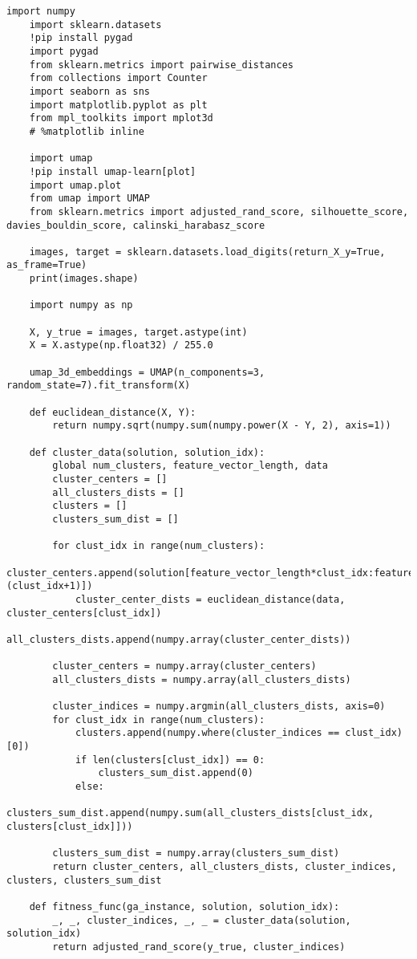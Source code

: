 \begin{lstlisting}[label=lst:1,caption=Кластеризация с использованием генетического алгоритма]
	import numpy
	import sklearn.datasets
	!pip install pygad
	import pygad
	from sklearn.metrics import pairwise_distances
	from collections import Counter
	import seaborn as sns
	import matplotlib.pyplot as plt
	from mpl_toolkits import mplot3d
	# %matplotlib inline
	
	import umap
	!pip install umap-learn[plot]
	import umap.plot
	from umap import UMAP
	from sklearn.metrics import adjusted_rand_score, silhouette_score, davies_bouldin_score, calinski_harabasz_score
	
	images, target = sklearn.datasets.load_digits(return_X_y=True, as_frame=True)
	print(images.shape)
	
	import numpy as np
	
	X, y_true = images, target.astype(int)
	X = X.astype(np.float32) / 255.0
	
	umap_3d_embeddings = UMAP(n_components=3, random_state=7).fit_transform(X)
	
	def euclidean_distance(X, Y):
		return numpy.sqrt(numpy.sum(numpy.power(X - Y, 2), axis=1))
	
	def cluster_data(solution, solution_idx):
		global num_clusters, feature_vector_length, data
		cluster_centers = []
		all_clusters_dists = []
		clusters = []
		clusters_sum_dist = []
		
		for clust_idx in range(num_clusters):
			cluster_centers.append(solution[feature_vector_length*clust_idx:feature_vector_length*(clust_idx+1)])
			cluster_center_dists = euclidean_distance(data, cluster_centers[clust_idx])
			all_clusters_dists.append(numpy.array(cluster_center_dists))
		
		cluster_centers = numpy.array(cluster_centers)
		all_clusters_dists = numpy.array(all_clusters_dists)
		
		cluster_indices = numpy.argmin(all_clusters_dists, axis=0)
		for clust_idx in range(num_clusters):
			clusters.append(numpy.where(cluster_indices == clust_idx)[0])
			if len(clusters[clust_idx]) == 0:
				clusters_sum_dist.append(0)
			else:
				clusters_sum_dist.append(numpy.sum(all_clusters_dists[clust_idx, clusters[clust_idx]]))
		
		clusters_sum_dist = numpy.array(clusters_sum_dist)
		return cluster_centers, all_clusters_dists, cluster_indices, clusters, clusters_sum_dist
	
	def fitness_func(ga_instance, solution, solution_idx):
		_, _, cluster_indices, _, _ = cluster_data(solution, solution_idx)
		return adjusted_rand_score(y_true, cluster_indices)
	

\end{lstlisting}

